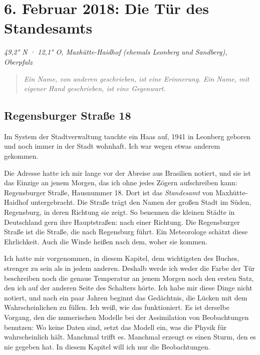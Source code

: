 \documentclass[
  ngerman,
  11pt,
  openany]{book}
\begin{document}
\chapter{6. Februar 2018: Die Tür des Standesamts}\label{cap-17}

\emph{49,2° N · 12,1° O, Maxhütte-Haidhof (ehemals Leonberg und
Sandberg), Oberpfalz}

\begin{quote}
\emph{Ein Name, von anderen geschrieben, ist eine Erinnerung. Ein Name,
mit eigener Hand geschrieben, ist eine Gegenwart.}
\end{quote}

\section{Regensburger Straße 18}\label{regensburger-strauxdfe-18}

Im System der Stadtverwaltung tauchte ein Haas auf, 1941 in Leonberg
geboren und noch immer in der Stadt wohnhaft. Ich war wegen etwas
anderem gekommen.

Die Adresse hatte ich mir lange vor der Abreise aus Brasilien notiert,
und sie ist das Einzige an jenem Morgen, das ich ohne jedes Zögern
aufschreiben kann: Regensburger Straße, Hausnummer 18. Dort ist das
\emph{Standesamt} von Maxhütte-Haidhof untergebracht. Die Straße trägt
den Namen der großen Stadt im Süden, Regensburg, in deren Richtung sie
zeigt. So benennen die kleinen Städte in Deutschland gern ihre
Hauptstraßen: nach einer Richtung. Die Regensburger Straße ist die
Straße, die nach Regensburg führt. Ein Meteorologe schätzt diese
Ehrlichkeit. Auch die Winde heißen nach dem, woher sie kommen.

Ich hatte mir vorgenommen, in diesem Kapitel, dem wichtigsten des
Buches, strenger zu sein als in jedem anderen. Deshalb werde ich weder
die Farbe der Tür beschreiben noch die genaue Temperatur an jenem Morgen
noch den ersten Satz, den ich auf der anderen Seite des Schalters hörte.
Ich habe mir diese Dinge nicht notiert, und nach ein paar Jahren beginnt
das Gedächtnis, die Lücken mit dem Wahrscheinlichen zu füllen. Ich weiß,
wie das funktioniert. Es ist derselbe Vorgang, den die numerischen
Modelle bei der Assimilation von Beobachtungen benutzen: Wo keine Daten
sind, setzt das Modell ein, was die Physik für wahrscheinlich hält.
Manchmal trifft es. Manchmal erzeugt es einen Sturm, den es nie gegeben
hat. In diesem Kapitel will ich nur die Beobachtungen.
\end{document}
